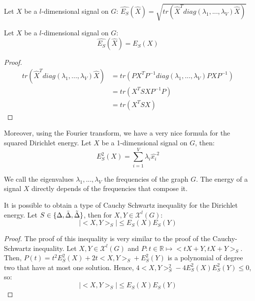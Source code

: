 \documentclass[12pt]{article}
\begin{document}
\begin{definition}
    Let $X$ be a $l$-dimensional signal on $G$: 
    $\widehat{E_S}(\widehat{X}) = \sqrt{tr(\widehat{X}^T diag(\lambda_1,...,\lambda_V) \widehat{X})}$
\end{definition}

\begin{thm}\label{thm:fourierenergy}
    Let $X$ be a $l$-dimensional signal on $G$:
    $$\widehat{E_S}(\widehat{X}) = E_S(X)$$
\end{thm}

\begin{proof}
    \begin{align*}
        tr(\widehat{X}^T diag(\lambda_1,...,\lambda_V) \widehat{X}) &= tr(P X^T P^{-1} diag(\lambda_1,...,\lambda_V) P X P^{-1} ) \\
        &= tr(X^T S X P^{-1} P) \\
        &=  tr(X^T S X)
    \end{align*}
\end{proof}

Moreover, using the Fourier transform, we have a very nice formula for the squared Dirichlet energy. Let $X$ be a 1-dimensional signal on $G$, then:
$$
E^2_S(X) = \sum_{i=1}^V \lambda_i \widehat{x_i}^2 
$$

We call the eigenvalues $\lambda_1,...,\lambda_V$ the frequencies of the graph $G$. The energy of a signal $X$ directly depends of the frequencies that compose it.

\begin{thm}
    It is possible to obtain a type of Cauchy Schwartz inequality for the Dirichlet energy. Let $S \in \{\Delta, \bar{\Delta}, \Tilde{\Delta}\}$, then for $X,Y \in \mathcal{X}^l(G)$:
    \begin{equation*}
        \left| <X,Y>_S \right| \leq E_S(X) E_S(Y)
    \end{equation*}
\end{thm}

\begin{proof}
    The proof of this inequality is very similar to the proof of the Cauchy-Schwartz inequality. Let $X, Y \in \mathcal{X}^l(G)$ and $P: t \in \mathbb{R} \mapsto <tX+Y, tX+Y>_{S}$. Then, $P(t) = t^2E^2_{S}(X) + 2t<X,Y>_{S} + E^2_{S}(Y)$ is a polynomial of degree two that have at most one solution. Hence, $4<X,Y>_S^2 - 4E^2_S(X)E^2_S(Y) \leq 0$, so:
    \begin{equation*}
         \left| <X,Y>_S \right| \leq E_S(X) E_S(Y)
    \end{equation*}
\end{proof}
\end{document}
